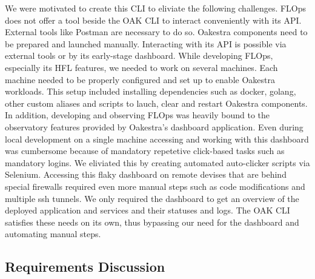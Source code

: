 We were motivated to create this CLI to eliviate the following challenges.
FLOps does not offer a tool beside the OAK CLI to interact conveniently with its API.
External tools like Postman are necessary to do so.
Oakestra components need to be prepared and launched manually.
Interacting with its API is possible via external tools or by its early-stage dashboard.
While developing FLOps, especially its HFL features, we needed to work on several machines.
Each machine needed to be properly configured and set up to enable Oakestra workloads.
This setup included installing dependencies such as docker, golang, other custom aliases and scripts to lauch, clear and restart Oakestra components.
In addition, developing and observing FLOps was heavily bound to the observatory features provided by Oakestra's dashboard application.
Even during local development on a single machine accessing and working with this dashboard was cumbersome because of mandatory repetetive click-based tasks such as mandatory logins.
We eliviated this by creating automated auto-clicker scripts via Selenium.
Accessing this flaky dashboard on remote devises that are behind special firewalls required even more manual steps such as code modifications and multiple ssh tunnels.
We only required the dashboard to get an overview of the deployed application and services and their statuses and logs.
The OAK CLI satisfies these needs on its own, thus bypassing our need for the dashboard and automating manual steps.

\subsection{Requirements Discussion}

